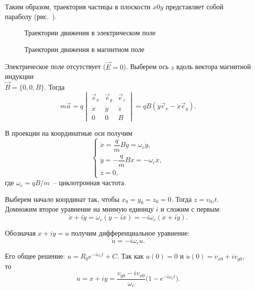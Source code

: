 Таким образом, траектория частицы в плоскости \( x0y \) представляет собой
параболу (рис.~).

\begin{figure}[h!]
  \center
  \parbox{.3\textwidth}{\caption{Траектории движения в электрическом поле}
    \label{pic06el}} \hspace{1em}
  \parbox{.3\textwidth}{\caption{Траектории движения в магнитном поле}
    \label{pic06mag}}
\end{figure}


Электрическое поле отсутствует (\( \vec{E} = 0 \)). Выберем ось \( z \) вдоль
вектора магнитной индукции\\ \( \vec{B} = \big\{ 0, 0, B \big\} \). Тогда
\[
  m\vec{a} = q
  \begin{vmatrix}
    \vec{e}_x & \vec{e}_y & \vec{e}_z \\
      \dot{x} &   \dot{y} &   \dot{z} \\
            0 &         0 &         B
  \end{vmatrix}
  = qB\left( \dot{y}\vec{e}_x - \dot{x}\vec{e}_y \right).
\]

В проекции на координатные оси получим
\[
  \left\{
    \begin{array}{l}
      \ddot{x} = \dfrac{q}{m}B\dot{y} = \omega_c\dot{y}, \\[.5em]
      \ddot{y} = -\dfrac{q}{m}B\dot{x} = -\omega_c\dot{x}, \\[.5em]
      \ddot{z} = 0,
    \end{array}
  \right.
\]
где \( \omega_c = qB / m \)~-- циклотронная частота.

Выберем начало координат так, чтобы \( x_0 = y_0 = z_0 = 0 \). Тогда
\( z = v_{0z}t \). Домножим второе уравнение на мнимую единицу \( i \) и сложим
с первым:
\[
  \ddot{x} + i\ddot{y} = \omega_c (\dot{y} - i\dot{x}) =
    -i\omega_c(\dot{x} + i\dot{y}).
\]

Обозначая \( x + iy = u \) получим дифференциальное уравнение:
\[
  \ddot{u} = -i\omega_c\dot{u}.
\]

Его общее решение: \( u = R_0 e^{-i\omega_c t} + C \). Так как \( u(0) = 0 \)
и \( \dot{u}(0) = v_{x0} + iv_{y0} \), то
\[
  u = x + iy = \frac{v_{y0} - iv_{x0}}{\omega_c}
    \Big( 1 - e^{-i\omega_c t} \Big).
\]

